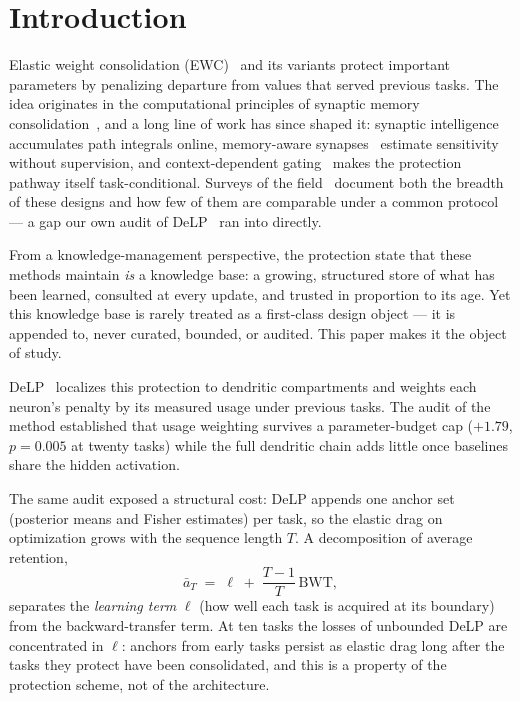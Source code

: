 \documentclass[review,12pt,number]{elsarticle}
\newcommand{\delp}{DeLP}
\begin{document}
\section{Introduction}
\label{sec:intro}

Elastic weight consolidation (EWC)~\cite{kirkpatrick2017} and its
variants protect important parameters by penalizing departure from
values that served previous tasks. The idea originates in the
computational principles of synaptic memory consolidation~\cite{benna2016},
and a long line of work has since shaped it: synaptic
intelligence~\cite{zenke2017} accumulates path integrals online,
memory-aware synapses~\cite{aljundi2018} estimate sensitivity without
supervision, and context-dependent gating~\cite{masse2018} makes the
protection pathway itself task-conditional. Surveys
of the field~\cite{parisi2019,delange2022} document both the breadth of
these designs and how few of them are comparable under a common
protocol --- a gap our own audit of \delp{}~\cite{zhou2026delp} ran into
directly.

From a knowledge-management perspective, the protection state that
these methods maintain \emph{is} a knowledge base: a growing, structured
store of what has been learned, consulted at every update, and
trusted in proportion to its age. Yet this knowledge base is rarely
treated as a first-class design object --- it is appended to, never
curated, bounded, or audited. This paper makes it the object of study.

\delp{}~\cite{zhou2026delp} localizes this protection to dendritic
compartments and weights each neuron's penalty by its measured usage
under previous tasks. The audit of the method
established that usage weighting survives a parameter-budget cap
($+1.79$, $p{=}0.005$ at twenty tasks) while the full dendritic chain
adds little once baselines share the hidden activation.

The same audit exposed a structural cost: \delp{} appends one anchor
set (posterior means and Fisher estimates) per task, so the elastic
drag on optimization grows with the sequence length $T$.
A decomposition of average retention,
%
\begin{equation}
\label{eq:decomp}
\bar a_T \;=\; \ell \;+\; \frac{T-1}{T}\,\mathrm{BWT},
\end{equation}
%
separates the \emph{learning term} $\ell$ (how well each task is
acquired at its boundary) from the backward-transfer term.
At ten tasks the losses of unbounded \delp{} are concentrated in $\ell$:
anchors from early tasks persist as elastic drag long after the tasks
they protect have been consolidated, and this is a property of the
protection scheme, not of the architecture.
\end{document}
